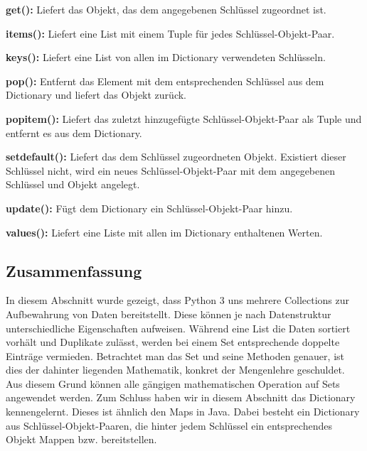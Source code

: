 \textbf{get():}
Liefert das Objekt, das dem angegebenen Schlüssel zugeordnet ist.

\label{collections:lst:dictget}

\textbf{items():}
Liefert eine List mit einem Tuple für jedes Schlüssel-Objekt-Paar.

\label{collections:lst:dictitems}

\textbf{keys():}
Liefert eine List von allen im Dictionary verwendeten Schlüsseln.

\label{collections:lst:dictkeys}

\textbf{pop():}
Entfernt das Element mit dem entsprechenden Schlüssel aus dem Dictionary und liefert das Objekt zurück.

\label{collections:lst:dictpop}

\textbf{popitem():}
Liefert das zuletzt hinzugefügte Schlüssel-Objekt-Paar als Tuple und entfernt es aus dem Dictionary.

\label{collections:lst:dictpopitem}

\textbf{setdefault():}
Liefert das dem Schlüssel zugeordneten Objekt. Existiert dieser Schlüssel nicht, wird ein neues Schlüssel-Objekt-Paar mit dem angegebenen Schlüssel und Objekt angelegt.

\label{collections:lst:dictsetdefault}

\textbf{update():}
Fügt dem Dictionary ein Schlüssel-Objekt-Paar hinzu.

\label{collections:lst:dictupdate}

\textbf{values():}
Liefert eine Liste mit allen im Dictionary enthaltenen Werten.

\label{collections:lst:dictvalues}

\subsection{Zusammenfassung}
\label{collections:summary}

In diesem Abschnitt wurde gezeigt, dass Python 3 uns mehrere Collections zur Aufbewahrung von Daten bereitstellt. Diese können je nach Datenstruktur unterschiedliche Eigenschaften aufweisen. Während eine List die Daten sortiert vorhält und Duplikate zulässt, werden bei einem Set entsprechende doppelte Einträge vermieden. Betrachtet man das Set und seine Methoden genauer, ist dies der dahinter liegenden Mathematik, konkret der Mengenlehre geschuldet. Aus diesem Grund können alle gängigen mathematischen Operation auf Sets angewendet werden. Zum Schluss haben wir in diesem Abschnitt das Dictionary kennengelernt. Dieses ist ähnlich den Maps in Java. Dabei besteht ein Dictionary aus Schlüssel-Objekt-Paaren, die hinter jedem Schlüssel ein entsprechendes Objekt Mappen bzw. bereitstellen.
